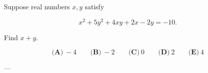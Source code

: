 Suppose real numbers \(x,y\) satisfy



\[
x^2+5y^2+4xy+2x-2y=-10.
\]

Find \(x+y\).



\[
\textbf{(A)}\ -4
\qquad
\textbf{(B)}\ -2
\qquad
\textbf{(C)}\ 0
\qquad
\textbf{(D)}\ 2
\qquad
\textbf{(E)}\ 4
\]

---
